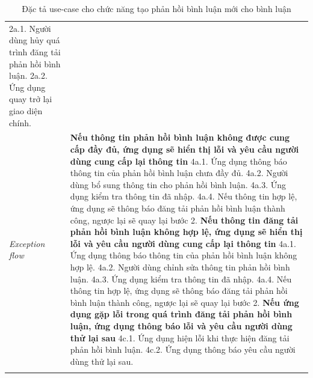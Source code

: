 \begin{center}
\begin{longtable}{
        |>{\raggedright\arraybackslash}p{3cm}
        |>{\raggedright\arraybackslash}p{13cm}
        |}
        2a.1. Người dùng hủy quá trình đăng tải phản hồi bình luận. \newline
        2a.2. Ứng dụng quay trở lại giao diện chính.
        \\\hdashline
        \rowcolor{cyan!10!white} \textit{Exception flow} & 
        \textbf{Nếu thông tin phản hồi bình luận không được cung cấp đầy đủ, ứng dụng sẽ hiển thị lỗi và yêu cầu người dùng cung cấp lại thông tin} \newline
        4a.1. Ứng dụng thông báo thông tin của phản hồi bình luận chưa đầy đủ. \newline
        4a.2. Người dùng bổ sung thông tin cho phản hồi bình luận. \newline
        4a.3. Ứng dụng kiểm tra thông tin đã nhập. \newline
        4a.4. Nếu thông tin hợp lệ, ứng dụng sẽ thông báo đăng tải phản hồi bình luận thành công, ngược lại sẽ quay lại bước 2. \newline
        \textbf{Nếu thông tin đăng tải phản hồi bình luận không hợp lệ, ứng dụng sẽ hiển thị lỗi và yêu cầu người dùng cung cấp lại thông tin} \newline
        4a.1. Ứng dụng thông báo thông tin của phản hồi bình luận không hợp lệ. \newline
        4a.2. Người dùng chỉnh sửa thông tin phản hồi bình luận. \newline
        4a.3. Ứng dụng kiểm tra thông tin đã nhập. \newline
        4a.4. Nếu thông tin hợp lệ, ứng dụng sẽ thông báo đăng tải phản hồi bình luận thành công, ngược lại sẽ quay lại bước 2. \newline
        \textbf{Nếu ứng dụng gặp lỗi trong quá trình đăng tải phản hồi bình luận, ứng dụng thông báo lỗi và yêu cầu người dùng thử lại sau} \newline
        4c.1. Ứng dụng hiện lỗi khi thực hiện đăng tải phản hồi bình luận. \newline
        4c.2. Ứng dụng thông báo yêu cầu người dùng thử lại sau.
        \\\hline
        \caption{Đặc tả use-case cho chức năng tạo phản hồi bình luận mới cho bình luận}
    \end{longtable}
\end{center}
